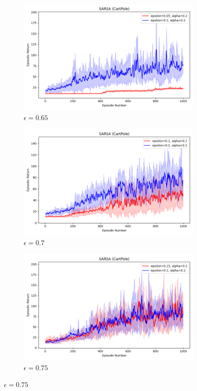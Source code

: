 \documentclass[11pt, a4]{article}
\begin{document}
\begin{figure}[h]
				\begin{subfigure}[h]{0.3\textwidth}
					\centering
					\includegraphics[width=\textwidth]{../cartpole-v1/plots/sarsa_0.2_0.05vs0.2_0.2.png}
					\caption{$\epsilon = 0.65$}
				\end{subfigure}
				\hfill
				\begin{subfigure}[h]{0.3\textwidth}
					\centering
					\includegraphics[width=\textwidth]{../cartpole-v1/plots/sarsa_0.2_0.1vs0.2_0.2.png}
					\caption{$\epsilon = 0.7$}
				\end{subfigure}
				\hfill
				\begin{subfigure}[h]{0.3\textwidth}
					\centering
					\includegraphics[width=\textwidth]{../cartpole-v1/plots/sarsa_0.2_0.15vs0.2_0.2.png}
					\caption{$\epsilon = 0.75$}
				\end{subfigure}
				

\end{figure}
\end{document}
